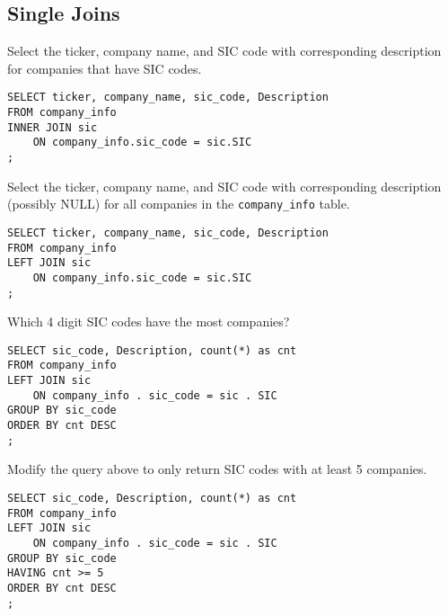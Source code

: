 \documentclass[10pt]{exam}
\begin{document}
\begin{questions}

\subsection*{Single Joins}

\question Select the ticker, company name, and SIC code with corresponding description for
    companies that have SIC codes.

\begin{solution}
\begin{lstlisting}
SELECT ticker, company_name, sic_code, Description
FROM company_info
INNER JOIN sic
    ON company_info.sic_code = sic.SIC
;
\end{lstlisting}
\end{solution}


\question Select the ticker, company name, and SIC code with corresponding
    description (possibly NULL) for
    all companies in the \texttt{company\_info} table. 

\begin{solution}
\begin{lstlisting}
SELECT ticker, company_name, sic_code, Description
FROM company_info
LEFT JOIN sic
    ON company_info.sic_code = sic.SIC
;
\end{lstlisting}
\end{solution}

\question Which 4 digit SIC codes have the most companies?

\begin{solution}
\begin{lstlisting}
SELECT sic_code, Description, count(*) as cnt
FROM company_info
LEFT JOIN sic
    ON company_info . sic_code = sic . SIC
GROUP BY sic_code
ORDER BY cnt DESC
;
\end{lstlisting}
\end{solution}

\question Modify the query above to only return SIC codes with at least
5 companies.

\begin{solution}
\begin{lstlisting}
SELECT sic_code, Description, count(*) as cnt
FROM company_info
LEFT JOIN sic
    ON company_info . sic_code = sic . SIC
GROUP BY sic_code
HAVING cnt >= 5
ORDER BY cnt DESC
;
\end{lstlisting}
\end{solution}




\end{questions}
\end{document}
